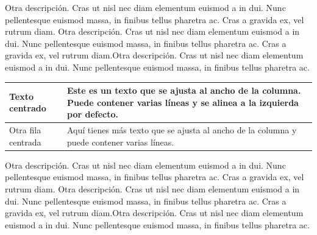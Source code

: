 \documentclass[b5paper, 10pt]{book}
\begin{document}
Otra descripción. Cras ut nisl nec diam elementum euismod a in dui. Nunc pellentesque euismod massa, in finibus tellus pharetra ac. Cras a gravida ex, vel rutrum diam. Otra descripción. Cras ut nisl nec diam elementum euismod a in dui. Nunc pellentesque euismod massa, in finibus tellus pharetra ac. Cras a gravida ex, vel rutrum diam.Otra descripción. Cras ut nisl nec diam elementum euismod a in dui. Nunc pellentesque euismod massa, in finibus tellus pharetra ac.

\begin{table}[ht]
	\begin{center}
		\begin{tabular}{|p{4cm}|p{6cm}|}
			\hline
			\centering Texto centrado & 
			Este es un texto que se ajusta al ancho de la columna.
			Puede contener varias líneas y se alinea a la izquierda por defecto. \\
			\hline
			\centering Otra fila centrada &
			Aquí tienes más texto que se ajusta al ancho de la columna 
			y puede contener varias líneas. \\
			\hline
		\end{tabular}
	\end{center}
\end{table}

Otra descripción. Cras ut nisl nec diam elementum euismod a in dui. Nunc pellentesque euismod massa, in finibus tellus pharetra ac. Cras a gravida ex, vel rutrum diam. Otra descripción. Cras ut nisl nec diam elementum euismod a in dui. Nunc pellentesque euismod massa, in finibus tellus pharetra ac. Cras a gravida ex, vel rutrum diam.Otra descripción. Cras ut nisl nec diam elementum euismod a in dui. Nunc pellentesque euismod massa, in finibus tellus pharetra ac.


\begin{table}[htbp]
	\centering
	\caption{Una tabla ajustada al ancho de la página}
	\label{tab:ajustada}
	
\end{table}
\end{document}
